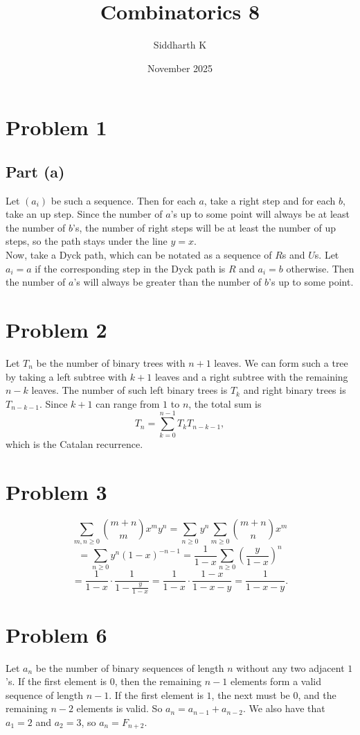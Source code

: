 \documentclass{article}
\title{Combinatorics 8}
\author{Siddharth K}
\date{November 2025}
\newcommand{\bigp}[1]{\left(#1\right)}
\begin{document}
\maketitle

\section*{Problem 1}
\subsection*{Part (a)}
Let $(a_i)$ be such a sequence. Then for each $a$, take a right step and for each $b$, take an up step. Since the number of $a$'s up to some point will always be at least the number of $b$'s, the number of right steps will be at least the number of up steps, so the path stays under the line $y = x$. \\

Now, take a Dyck path, which can be notated as a sequence of $R$s and $U$s. Let $a_i = a$ if the corresponding step in the Dyck path is $R$ and $a_i = b$ otherwise. Then the number of $a$'s will always be greater than the number of $b$'s up to some point.

\section*{Problem 2}
Let $T_n$ be the number of binary trees with $n + 1$ leaves. We can form such a tree by taking a left subtree with $k + 1$ leaves and a right subtree with the remaining $n - k$ leaves. The number of such left binary trees is $T_k$ and right binary trees is $T_{n - k - 1}$. Since $k + 1$ can range from $1$ to $n$, the total sum is
$$T_n = \sum_{k = 0}^{n - 1}T_kT_{n - k - 1},$$
which is the Catalan recurrence.

\section*{Problem 3}
$$\sum_{m,n \ge 0} \binom{m + n}{m}x^my^n = \sum_{n \ge 0}y^n\sum_{m \ge 0}\binom{m + n}{n}x^m$$
$$= \sum_{n \ge 0}y^n(1 - x)^{-n-1} = \frac{1}{1 - x}\sum_{n \ge 0} \bigp{\frac{y}{1 - x}}^n$$
$$= \frac{1}{1 - x} \cdot \frac{1}{1 - \frac{y}{1 - x}} = \frac{1}{1 - x}\cdot \frac{1 - x}{1 - x - y} = \frac{1}{1 - x - y}.$$

\section*{Problem 6}
Let $a_n$ be the number of binary sequences of length $n$ without any two adjacent $1$'s. If the first element is $0$, then the remaining $n - 1$ elements form a valid sequence of length $n - 1$. If the first element is $1$, the next must be $0$, and the remaining $n - 2$ elements is valid. So $a_n = a_{n - 1} + a_{n - 2}$. We also have that $a_1 = 2$ and $a_2 = 3$, so $a_n = F_{n + 2}$.
\end{document}
